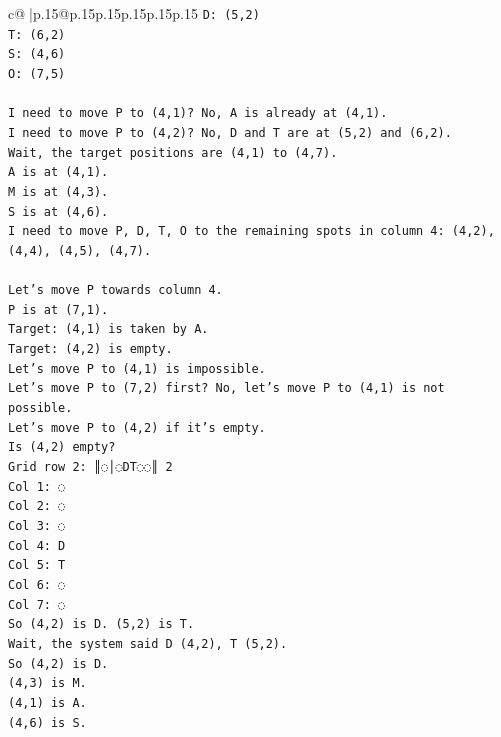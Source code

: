 \documentclass{article}
\begin{document}
{\begin{supertabular}{c@{$\;$}|p{.15\linewidth}@{}p{.15\linewidth}p{.15\linewidth}p{.15\linewidth}p{.15\linewidth}p{.15\linewidth}}
{{{\texttt{D: (5,2)} \\
\texttt{T: (6,2)} \\
\texttt{S: (4,6)} \\
\texttt{O: (7,5)} \\
\\ 
\texttt{I need to move P to (4,1)? No, A is already at (4,1).} \\
\texttt{I need to move P to (4,2)? No, D and T are at (5,2) and (6,2).} \\
\texttt{Wait, the target positions are (4,1) to (4,7).} \\
\texttt{A is at (4,1).} \\
\texttt{M is at (4,3).} \\
\texttt{S is at (4,6).} \\
\texttt{I need to move P, D, T, O to the remaining spots in column 4: (4,2), (4,4), (4,5), (4,7).} \\
\\ 
\texttt{Let's move P towards column 4.} \\
\texttt{P is at (7,1).} \\
\texttt{Target: (4,1) is taken by A.} \\
\texttt{Target: (4,2) is empty.} \\
\texttt{Let's move P to (4,1) is impossible.} \\
\texttt{Let's move P to (7,2) first? No, let's move P to (4,1) is not possible.} \\
\texttt{Let's move P to (4,2) if it's empty.} \\
\texttt{Is (4,2) empty?} \\
\texttt{Grid row 2: ║◌│◌DT◌◌║ 2} \\
\texttt{Col 1: ◌} \\
\texttt{Col 2: ◌} \\
\texttt{Col 3: ◌} \\
\texttt{Col 4: D} \\
\texttt{Col 5: T} \\
\texttt{Col 6: ◌} \\
\texttt{Col 7: ◌} \\
\texttt{So (4,2) is D. (5,2) is T.} \\
\texttt{Wait, the system said D (4,2), T (5,2).} \\
\texttt{So (4,2) is D.} \\
\texttt{(4,3) is M.} \\
\texttt{(4,1) is A.} \\
\texttt{(4,6) is S.} \\
}}}
\end{supertabular}}
\end{document}
